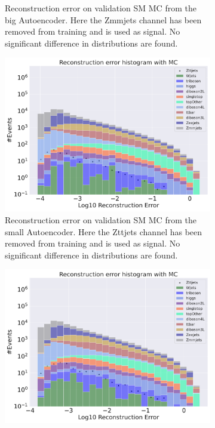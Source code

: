 \begin{figure}[H]
\begin{subfigure}{.45\textwidth}
        \caption{Reconstruction error on validation SM MC from the big Autoencoder. Here the Zmmjets channel has been removed from training and 
        is used as signal. No significant difference in distributions are found. }
        \label{fig:ae_big_Zmmjets}
    \end{subfigure}
    \hfill
    \begin{subfigure}{.45\textwidth}
        \includegraphics[width=\textwidth]{Figures/AE_testing/small/b_data_recon_big_rm3_feats_sig_Zttjets.pdf}
        \caption{Reconstruction error on validation SM MC from the small Autoencoder. Here the Zttjets channel has been removed from training and 
        is used as signal. No significant difference in distributions are found. }
        \label{fig:ae_small_Zttjets}
    \end{subfigure}
    \hfill 
    \begin{subfigure}{.45\textwidth}
        \includegraphics[width=\textwidth]{Figures/AE_testing/big/b_data_recon_big_rm3_feats_sig_Zttjets.pdf}

\end{subfigure}
\end{figure}
